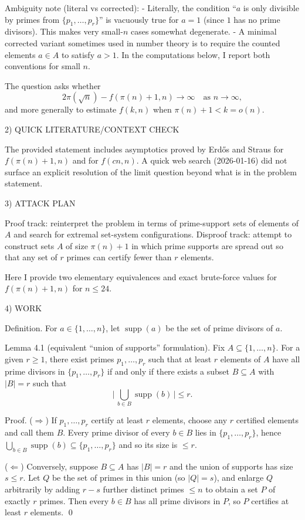 Ambiguity note (literal vs corrected):
- Literally, the condition ``$a$ is only divisible by primes from $\{p_1,\dots,p_r\}$'' is vacuously true for $a=1$ (since $1$ has no prime divisors). This makes very small-$n$ cases somewhat degenerate.
- A minimal corrected variant sometimes used in number theory is to require the counted elements $a\in A$ to satisfy $a>1$.
In the computations below, I report both conventions for small $n$.

The question asks whether
\[
2\pi(\sqrt n)-f(\pi(n)+1,n)\to\infty\quad\text{as }n\to\infty,
\]
and more generally to estimate $f(k,n)$ when $\pi(n)+1<k=o(n)$.

2) QUICK LITERATURE/CONTEXT CHECK

The provided statement includes asymptotics proved by Erd\H{o}s and Straus for $f(\pi(n)+1,n)$ and for $f(cn,n)$.
A quick web search (2026-01-16) did not surface an explicit resolution of the limit question beyond what is in the problem statement.

3) ATTACK PLAN

Proof track: reinterpret the problem in terms of prime-support sets of elements of $A$ and search for extremal set-system configurations.
Disproof track: attempt to construct sets $A$ of size $\pi(n)+1$ in which prime supports are spread out so that any set of $r$ primes can certify fewer than $r$ elements.

Here I provide two elementary equivalences and exact brute-force values for $f(\pi(n)+1,n)$ for $n\le 24$.

4) WORK

Definition.
For $a\in\{1,\dots,n\}$, let $\operatorname{supp}(a)$ be the set of prime divisors of $a$.

Lemma 4.1 (equivalent ``union of supports'' formulation).
Fix $A\subseteq\{1,\dots,n\}$.
For a given $r\ge 1$, there exist primes $p_1,\dots,p_r$ such that at least $r$ elements of $A$ have all prime divisors in $\{p_1,\dots,p_r\}$
if and only if there exists a subset $B\subseteq A$ with $|B|=r$ such that
\[
\bigl|\,\bigcup_{b\in B}\operatorname{supp}(b)\,\bigr|\le r.
\]

Proof.
($\Rightarrow$) If $p_1,\dots,p_r$ certify at least $r$ elements, choose any $r$ certified elements and call them $B$.
Every prime divisor of every $b\in B$ lies in $\{p_1,\dots,p_r\}$, hence
$\bigcup_{b\in B}\operatorname{supp}(b)\subseteq\{p_1,\dots,p_r\}$ and so its size is $\le r$.

($\Leftarrow$) Conversely, suppose $B\subseteq A$ has $|B|=r$ and the union of supports has size $s\le r$.
Let $Q$ be the set of primes in this union (so $|Q|=s$), and enlarge $Q$ arbitrarily by adding $r-s$ further distinct primes $\le n$ to obtain a set $P$ of exactly $r$ primes.
Then every $b\in B$ has all prime divisors in $P$, so $P$ certifies at least $r$ elements.
\qed

